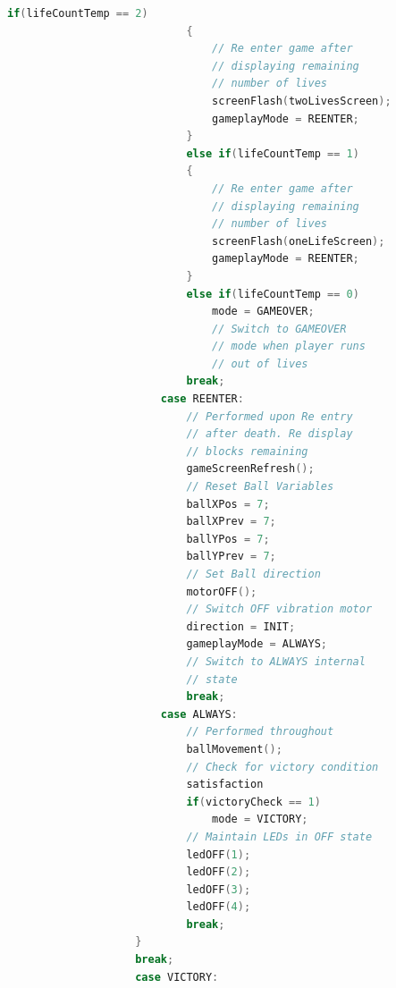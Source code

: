 \documentclass{article}
\begin{document}
\begin{lstlisting}[basicstyle = \small, language = C]
                            if(lifeCountTemp == 2)
                            {
                                // Re enter game after 
                                // displaying remaining 
                                // number of lives
                                screenFlash(twoLivesScreen);
                                gameplayMode = REENTER;
                            }
                            else if(lifeCountTemp == 1)
                            {
                                // Re enter game after 
                                // displaying remaining 
                                // number of lives
                                screenFlash(oneLifeScreen);
                                gameplayMode = REENTER;
                            }
                            else if(lifeCountTemp == 0)
                                mode = GAMEOVER;
                                // Switch to GAMEOVER 
                                // mode when player runs 
                                // out of lives
                            break;
                        case REENTER:
                            // Performed upon Re entry 
                            // after death. Re display 
                            // blocks remaining
                            gameScreenRefresh(); 
                            // Reset Ball Variables
                            ballXPos = 7;
                            ballXPrev = 7;
                            ballYPos = 7;
                            ballYPrev = 7;
                            // Set Ball direction
                            motorOFF(); 
                            // Switch OFF vibration motor
                            direction = INIT;
                            gameplayMode = ALWAYS; 
                            // Switch to ALWAYS internal 
                            // state
                            break;
                        case ALWAYS:
                            // Performed throughout
                            ballMovement();
                            // Check for victory condition 
                            satisfaction
                            if(victoryCheck == 1)
                                mode = VICTORY;
                            // Maintain LEDs in OFF state
                            ledOFF(1);
                            ledOFF(2);
                            ledOFF(3);
                            ledOFF(4);
                            break;
                    }
                    break;
                    case VICTORY:

\end{lstlisting}
\end{document}
